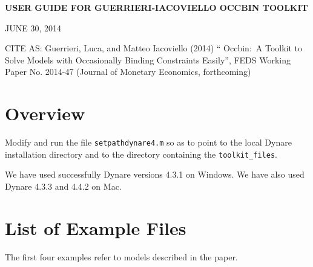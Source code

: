 \documentclass[12pt]{article}
\begin{document}
\setcounter{secnumdepth}{-1}%

\renewcommand{\baselinestretch}{1.05}
\normalsize%

\begin{center}
{\Large \textbf{USER GUIDE FOR GUERRIERI-IACOVIELLO OCCBIN TOOLKIT} }

{\normalsize \vspace{1cm} JUNE 30, 2014}
\end{center}

CITE AS: Guerrieri, Luca, and Matteo Iacoviello (2014) \textquotedblleft
Occbin:\ A Toolkit to Solve Models with Occasionally Binding Constraints
Easily\textquotedblright , FEDS Working Paper No. 2014-47 (Journal of
Monetary Economics, forthcoming)

\bigskip

\section{Overview}

Modify and run the file \texttt{setpathdynare4.m} so as to point to the
local Dynare installation directory and to the directory containing the 
\texttt{toolkit\_files}.

We have used successfully Dynare versions 4.3.1 on Windows. We have also
used Dynare 4.3.3 and 4.4.2 on Mac.

\section{List of Example Files}

The first four examples refer to models described in the paper.
\end{document}
